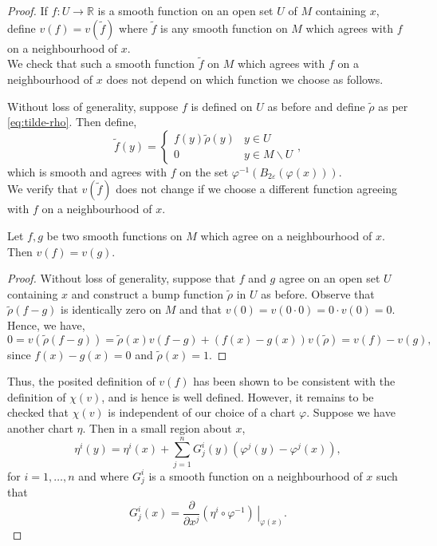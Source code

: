 \begin{proof}
If $f:U\to\mathbb{R}$ is a smooth function on an open set $U$ of $M$ containing $x$, define $v(f)=v(\tilde{f})$ where $\tilde{f}$ is any smooth function on $M$ which agrees with $f$ on a neighbourhood of $x$.\\

We check that such a smooth function $\tilde{f}$ on $M$ which agrees with $f$ on a neighbourhood of $x$ does not depend on which function we choose as follows.

Without loss of generality, suppose $f$ is defined on $U$ as before and define $\tilde{\rho}$ as per \eqref{eq:tilde-rho}. Then define,
\begin{equation}
\tilde{f}(y)=\begin{cases}
f(y)\tilde{\rho}(y) & y\in U\\
0 & y\in M\backslash U
\end{cases},
\end{equation}
which is smooth and agrees with $f$ on the set $\varphi^{-1}\left( B_{2\varepsilon}(\varphi(x)) \right)$.\\

We verify that $v(\tilde{f})$ does not change if we choose a different function agreeing with $f$ on a neighbourhood of $x$.
\begin{lemma}
Let $f,g$ be two smooth functions on $M$ which agree on a neighbourhood of $x$. Then $v(f)=v(g)$.
\end{lemma}
\begin{proof}
Without loss of generality, suppose that $f$ and $g$ agree on an open set $U$ containing $x$ and construct a bump function $\tilde{\rho}$ in $U$ as before. Observe that $\tilde{\rho}(f-g)$ is identically zero on $M$ and that $v(0)=v(0\cdot 0)=0\cdot v(0)=0$. Hence, we have,
\[
0=v(\tilde{\rho}(f-g))=\tilde{\rho}(x)v(f-g)+(f(x)-g(x))v(\tilde{\rho})=v(f)-v(g),
\]
since $f(x)-g(x)=0$ and $\tilde{\rho}(x)=1$.
\end{proof}
Thus, the posited definition of $v(f)$ has been shown to be consistent with the definition of $\chi(v)$, and is hence is well defined. However, it remains to be checked that $\chi(v)$ is independent of our choice of a chart $\varphi$. Suppose we have another chart $\eta$. Then in a small region about $x$,
\begin{equation}
\eta^i(y)=\eta^i(x)+\sum_{j=1}^nG^i_j(y)\left( \varphi^j(y)-\varphi^j(x) \right),
\end{equation} 
for $i=1,\ldots,n$ and where $G^i_j$ is a smooth function on a neighbourhood of $x$ such that
\[
G^i_j(x)=\frac{\partial}{\partial x^j}\left.\left(\eta^i\circ\varphi^{-1}\right)\,\right\rvert_{\varphi(x)}.
\]


\end{proof}
